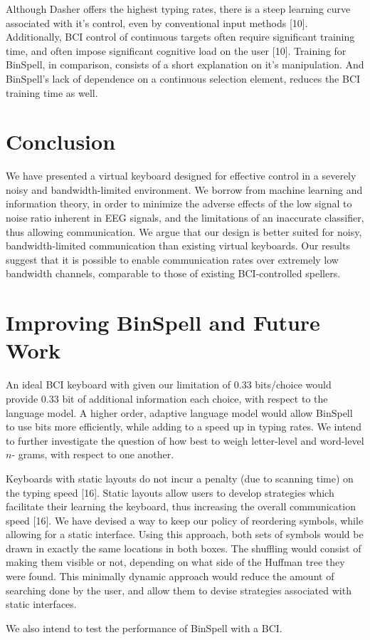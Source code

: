 \documentclass[12pt,titlepage]{article}
\begin{document}
Although Dasher offers the highest typing rates, there is a steep learning curve associated with 
it's control, even by conventional input methods [10].  Additionally, BCI control of continuous 
targets often require significant training time, and often impose significant cognitive load on 
the user [10].  Training for BinSpell, in comparison, consists of a short explanation on it's 
manipulation.  And BinSpell's lack of dependence on a continuous selection element, reduces 
the BCI training time as well.


\section{Conclusion}

We have presented a virtual keyboard designed for effective control in a severely noisy and
bandwidth-limited environment.  We borrow from machine learning and  information theory, in 
order to minimize the adverse effects of the low signal to noise ratio inherent in EEG signals, 
and the limitations of an inaccurate classifier, thus allowing communication.  We argue that our 
design is better suited for noisy, bandwidth-limited communication than existing virtual 
keyboards. Our results suggest that it is possible to enable communication rates over extremely 
low bandwidth channels, comparable to those of existing BCI-controlled spellers.


\section{Improving BinSpell and Future Work}

An ideal BCI keyboard with given our limitation of 0.33 bits/choice would provide 0.33 bit of 
additional information each choice, with respect to the language model.  A higher order, adaptive 
language model would allow BinSpell to use bits more efficiently, while adding to a speed up in typing 
rates.  We intend to further investigate the question of how best to weigh letter-level and word-level $n$- 
grams, with respect to one another. 

Keyboards with static layouts do not incur a penalty (due to scanning time) on the typing speed [16]. 
Static layouts allow users to develop strategies which facilitate their learning the keyboard, thus 
increasing the overall communication speed [16].  We have devised a way to keep our policy of 
reordering symbols, while allowing for a static interface.  Using this approach, both sets of symbols 
would be drawn in exactly the same locations in both boxes.  The  shuffling would consist of making 
them visible or not, depending on what side of the Huffman tree they were found.  This minimally 
dynamic approach would reduce the amount of searching done by the user, and allow them to devise 
strategies associated with static interfaces. 

We also intend to test the performance of BinSpell with a BCI.
\end{document}
